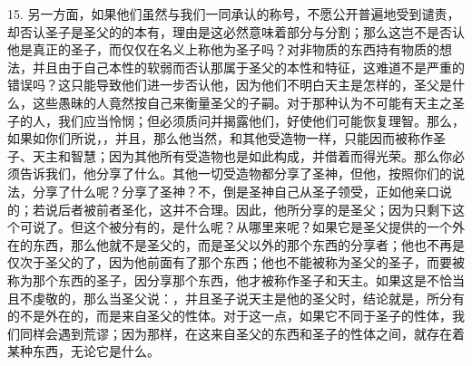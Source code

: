 15. 另一方面，如果他们虽然与我们一同承认的称号，不愿公开普遍地受到谴责，却否认圣子是圣父的的本有，理由是这必然意味着部分与分割；那么这岂不是否认他是真正的圣子，而仅仅在名义上称他为圣子吗？对非物质的东西持有物质的想法，并且由于自己本性的软弱而否认那属于圣父的本性和特征，这难道不是严重的错误吗？这只能导致他们进一步否认他，因为他们不明白天主是怎样的，圣父是什么，这些愚昧的人竟然按自己来衡量圣父的子嗣。对于那种认为不可能有天主之圣子的人，我们应当怜悯；但必须质问并揭露他们，好使他们可能恢复理智。那么，如果如你们所说，，并且，那么他当然，和其他受造物一样，只能因而被称作圣子、天主和智慧；因为其他所有受造物也是如此构成，并借着而得光荣。那么你必须告诉我们，他分享了什么。其他一切受造物都分享了圣神，但他，按照你们的说法，分享了什么呢？分享了圣神？不，倒是圣神自己从圣子领受，正如他亲口说的；若说后者被前者圣化，这并不合理。因此，他所分享的是圣父；因为只剩下这个可说了。但这个被分有的，是什么呢？从哪里来呢？如果它是圣父提供的一个外在的东西，那么他就不是圣父的，而是圣父以外的那个东西的分享者；他也不再是仅次于圣父的了，因为他前面有了那个东西；他也不能被称为圣父的圣子，而要被称为那个东西的圣子，因分享那个东西，他才被称作圣子和天主。如果这是不恰当且不虔敬的，那么当圣父说：，并且圣子说天主是他的圣父时，结论就是，所分有的不是外在的，而是来自圣父的性体。对于这一点，如果它不同于圣子的性体，我们同样会遇到荒谬；因为那样，在这来自圣父的东西和圣子的性体之间，就存在着某种东西，无论它是什么。\par

